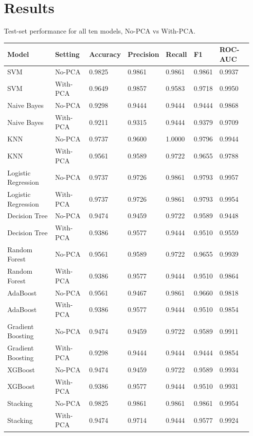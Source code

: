 \documentclass[12pt,a4paper]{article}
\begin{document}
\section{Results}
Test-set performance for all ten models, No-PCA vs With-PCA.

\begin{longtable}{p{3.2cm}p{1.6cm}p{1.4cm}p{1.6cm}p{1.3cm}p{1.4cm}p{1.4cm}}
\toprule
Model & Setting & Accuracy & Precision & Recall & F1 & ROC-AUC \\
\midrule
SVM & No-PCA & 0.9825 & 0.9861 & 0.9861 & 0.9861 & 0.9937 \\
SVM & With-PCA & 0.9649 & 0.9857 & 0.9583 & 0.9718 & 0.9950 \\
Naive Bayes & No-PCA & 0.9298 & 0.9444 & 0.9444 & 0.9444 & 0.9868 \\
Naive Bayes & With-PCA & 0.9211 & 0.9315 & 0.9444 & 0.9379 & 0.9709 \\
KNN & No-PCA & 0.9737 & 0.9600 & 1.0000 & 0.9796 & 0.9944 \\
KNN & With-PCA & 0.9561 & 0.9589 & 0.9722 & 0.9655 & 0.9788 \\
Logistic Regression & No-PCA & 0.9737 & 0.9726 & 0.9861 & 0.9793 & 0.9957 \\
Logistic Regression & With-PCA & 0.9737 & 0.9726 & 0.9861 & 0.9793 & 0.9954 \\
Decision Tree & No-PCA & 0.9474 & 0.9459 & 0.9722 & 0.9589 & 0.9448 \\
Decision Tree & With-PCA & 0.9386 & 0.9577 & 0.9444 & 0.9510 & 0.9559 \\
Random Forest & No-PCA & 0.9561 & 0.9589 & 0.9722 & 0.9655 & 0.9939 \\
Random Forest & With-PCA & 0.9386 & 0.9577 & 0.9444 & 0.9510 & 0.9864 \\
AdaBoost & No-PCA & 0.9561 & 0.9467 & 0.9861 & 0.9660 & 0.9818 \\
AdaBoost & With-PCA & 0.9386 & 0.9577 & 0.9444 & 0.9510 & 0.9854 \\
Gradient Boosting & No-PCA & 0.9474 & 0.9459 & 0.9722 & 0.9589 & 0.9911 \\
Gradient Boosting & With-PCA & 0.9298 & 0.9444 & 0.9444 & 0.9444 & 0.9854 \\
XGBoost & No-PCA & 0.9474 & 0.9459 & 0.9722 & 0.9589 & 0.9934 \\
XGBoost & With-PCA & 0.9386 & 0.9577 & 0.9444 & 0.9510 & 0.9931 \\
Stacking & No-PCA & 0.9825 & 0.9861 & 0.9861 & 0.9861 & 0.9954 \\
Stacking & With-PCA & 0.9474 & 0.9714 & 0.9444 & 0.9577 & 0.9924 \\
\bottomrule
\end{longtable}
\end{document}
